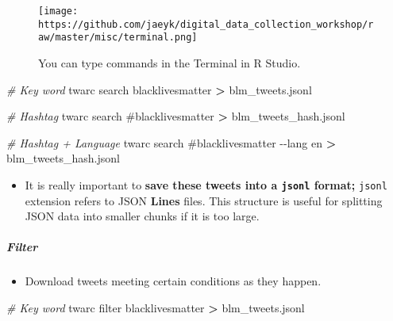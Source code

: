 \documentclass[
]{book}
\newenvironment{Shaded}{\begin{snugshade}}{\end{snugshade}}
\newcommand{\CommentTok}[1]{\textcolor[rgb]{0.56,0.35,0.01}{\textit{#1}}}
\newcommand{\ExtensionTok}[1]{#1}
\newcommand{\NormalTok}[1]{#1}
\newcommand{\OperatorTok}[1]{\textcolor[rgb]{0.81,0.36,0.00}{\textbf{#1}}}
\newcommand{\StringTok}[1]{\textcolor[rgb]{0.31,0.60,0.02}{#1}}
\providecommand{\tightlist}{%
  \setlength{\itemsep}{0pt}\setlength{\parskip}{0pt}}
\begin{document}
\begin{figure}
\centering
\texttt{[image: https://github.com/jaeyk/digital\_data\_collection\_workshop/raw/master/misc/terminal.png]}
\caption{You can type commands in the Terminal in R Studio.}
\end{figure}

\begin{Shaded}
\begin{Highlighting}[]
\CommentTok{\# Key word }
\ExtensionTok{twarc}\NormalTok{ search blacklivesmatter }\OperatorTok{\textgreater{}}\NormalTok{ blm\_tweets.jsonl}
\end{Highlighting}
\end{Shaded}

\begin{Shaded}
\begin{Highlighting}[]
\CommentTok{\# Hashtag }
\ExtensionTok{twarc}\NormalTok{ search }\StringTok{\textquotesingle{}\#blacklivesmatter\textquotesingle{}} \OperatorTok{\textgreater{}}\NormalTok{ blm\_tweets\_hash.jsonl}
\end{Highlighting}
\end{Shaded}

\begin{Shaded}
\begin{Highlighting}[]
\CommentTok{\# Hashtag + Language }
\ExtensionTok{twarc}\NormalTok{ search }\StringTok{\textquotesingle{}\#blacklivesmatter\textquotesingle{}}\NormalTok{ {-}{-}lang en }\OperatorTok{\textgreater{}}\NormalTok{ blm\_tweets\_hash.jsonl}
\end{Highlighting}
\end{Shaded}

\begin{itemize}
\tightlist
\item
  It is really important to \textbf{save these tweets into a \texttt{jsonl} format;} \texttt{jsonl} extension refers to JSON \textbf{Lines} files. This structure is useful for splitting JSON data into smaller chunks if it is too large.
\end{itemize}

\hypertarget{filter}{%
\subparagraph{Filter}\label{filter}}

\begin{itemize}
\tightlist
\item
  Download tweets meeting certain conditions as they happen.
\end{itemize}

\begin{Shaded}
\begin{Highlighting}[]
\CommentTok{\# Key word}
\ExtensionTok{twarc}\NormalTok{ filter blacklivesmatter }\OperatorTok{\textgreater{}}\NormalTok{ blm\_tweets.jsonl}
\end{Highlighting}
\end{Shaded}
\end{document}
